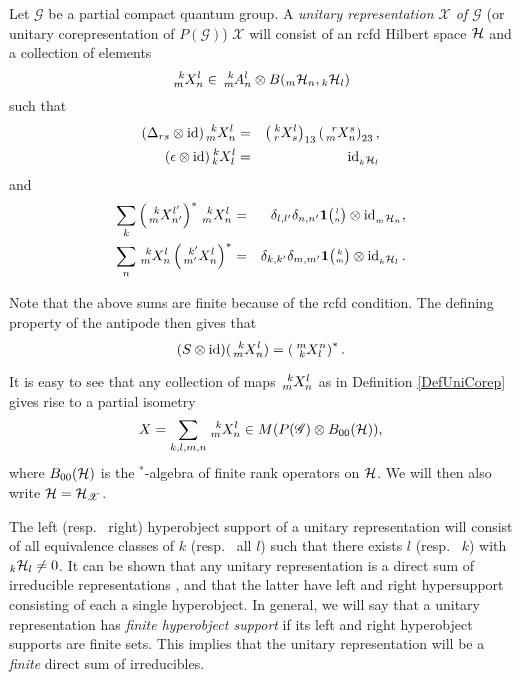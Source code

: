 \begin{Def}\label{DefUniCorep} Let $\mathscr{G}$ be a partial compact quantum group. A \emph{unitary representation $\mathscr{X}$ of $\mathscr{G}$} (or unitary corepresentation of $P(\mathscr{G})$) $\mathscr{X}$ will consist of an rcfd Hilbert space $\mathcal{H}$ and a collection of elements \[\Gr{X}{k}{l}{m}{n}\in \Gr{A}{k}{l}{m}{n}\otimes B(\GrDA{\Hsp}{m}{n},\GrDA{\Hsp}{k}{l})\] such that \begin{eqnarray*} (\Delta_{rs}\otimes \id)\Gr{X}{k}{l}{m}{n} &=& \left(\Gr{X}{k}{l}{r}{s}\right)_{13}\left(\Gr{X}{r}{s}{m}{n}\right)_{23},\\ (\epsilon\otimes \id)\Gr{X}{k}{l}{k}{l} &=& \id_{\GrDA{\Hsp}{k}{l}}\end{eqnarray*} and \begin{eqnarray*} \sum_{k} \left(\Gr{X}{k}{l'}{m}{n'}\right)^*\Gr{X}{k}{l}{m}{n} &=& \delta_{l,l'}  \delta_{n,n'} \UnitC{l}{n}\otimes \id_{\GrDA{\Hsp}{m}{n}},\\ \sum_{n} \Gr{X}{k}{l}{m}{n}\left(\Gr{X}{k'}{l}{m'}{n}\right)^* &=& \delta_{k,k'}\delta_{m,m'} \UnitC{k}{m}\otimes \id_{\GrDA{\Hsp}{k}{l}}.\end{eqnarray*}
\end{Def} 

Note that the above sums are finite because of the rcfd condition. The defining property of the antipode then gives that \[(S\otimes \id)(\Gr{X}{k}{l}{m}{n}) = \left(\Gr{X}{m}{n}{k}{l}\right)^*.\]

It is easy to see that any collection of maps $\Gr{X}{k}{l}{m}{n}$ as in Definition \ref{DefUniCorep} gives rise to a partial isometry \[X = \sum_{k,l,m,n}\Gr{X}{k}{l}{m}{n}\in M(P(\mathscr{G})\otimes B_{00}(\Hsp)),\] where $B_{00}(\mathcal{H})$ is the $^*$-algebra of finite rank operators on $\mathcal{H}$. We will then also write $\mathcal{H} = \mathcal{H}_{\mathscr{X}}$.


The left (resp.~ right) hyperobject support of a unitary representation will consist of all equivalence classes of $k$ (resp.~ all $l$) such that there exists $l$ (resp.~ $k$) with ${}_{k}\mathcal{H}_{l}\neq 0$. It can be shown that any unitary representation is a direct sum of irreducible representations \cite[Corollary 2.5]{DCT1}, and that the latter have left and right hypersupport consisting of each a single hyperobject. In general, we will say that a unitary representation has \emph{finite hyperobject support} if its left and right hyperobject supports are finite sets. This implies that the unitary representation will be a \emph{finite} direct sum of irreducibles. 

